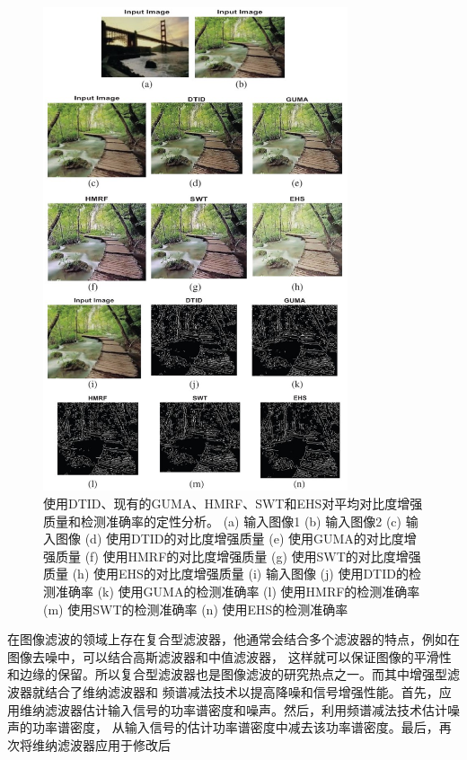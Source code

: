 \begin{figure}[htbp]
	\begin{center}
		\includegraphics[width = 0.8\textwidth]{images/03.eps}
		\caption{使用DTID、现有的GUMA、HMRF、SWT和EHS对平均对比度增强质量和检测准确率的定性分析。
        (a) 输入图像1 (b) 输入图像2 (c) 输入图像 (d) 使用DTID的对比度增强质量 (e) 使用GUMA的对比度增强质量 
        (f) 使用HMRF的对比度增强质量 (g) 使用SWT的对比度增强质量 (h) 使用EHS的对比度增强质量 
        (i) 输入图像 (j) 使用DTID的检测准确率 (k) 使用GUMA的检测准确率 (l) 使用HMRF的检测准确率 
        (m) 使用SWT的检测准确率 (n) 使用EHS的检测准确率} 
		\label{03} %
	\end{center}
\end{figure}

在图像滤波的领域上存在复合型滤波器，他通常会结合多个滤波器的特点，例如在图像去噪中，可以结合高斯滤波器和中值滤波器，
这样就可以保证图像的平滑性和边缘的保留。所以复合型滤波器也是图像滤波的研究热点之一。而其中增强型滤波器就结合了维纳滤波器和
频谱减法技术以提高降噪和信号增强性能。首先，应用维纳滤波器估计输入信号的功率谱密度和噪声。然后，利用频谱减法技术估计噪声的功率谱密度，
从输入信号的估计功率谱密度中减去该功率谱密度。最后，再次将维纳滤波器应用于修改后

